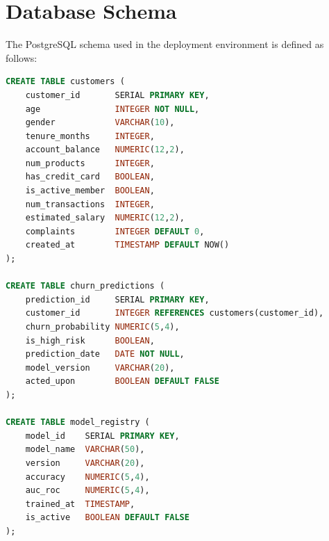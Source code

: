 \section{Database Schema}

The PostgreSQL schema used in the deployment environment is defined as follows:

\begin{lstlisting}[language=SQL, caption={Database Schema DDL}, label={lst:ddl}]
CREATE TABLE customers (
    customer_id       SERIAL PRIMARY KEY,
    age               INTEGER NOT NULL,
    gender            VARCHAR(10),
    tenure_months     INTEGER,
    account_balance   NUMERIC(12,2),
    num_products      INTEGER,
    has_credit_card   BOOLEAN,
    is_active_member  BOOLEAN,
    num_transactions  INTEGER,
    estimated_salary  NUMERIC(12,2),
    complaints        INTEGER DEFAULT 0,
    created_at        TIMESTAMP DEFAULT NOW()
);

CREATE TABLE churn_predictions (
    prediction_id     SERIAL PRIMARY KEY,
    customer_id       INTEGER REFERENCES customers(customer_id),
    churn_probability NUMERIC(5,4),
    is_high_risk      BOOLEAN,
    prediction_date   DATE NOT NULL,
    model_version     VARCHAR(20),
    acted_upon        BOOLEAN DEFAULT FALSE
);

CREATE TABLE model_registry (
    model_id    SERIAL PRIMARY KEY,
    model_name  VARCHAR(50),
    version     VARCHAR(20),
    accuracy    NUMERIC(5,4),
    auc_roc     NUMERIC(5,4),
    trained_at  TIMESTAMP,
    is_active   BOOLEAN DEFAULT FALSE
);
\end{lstlisting}

